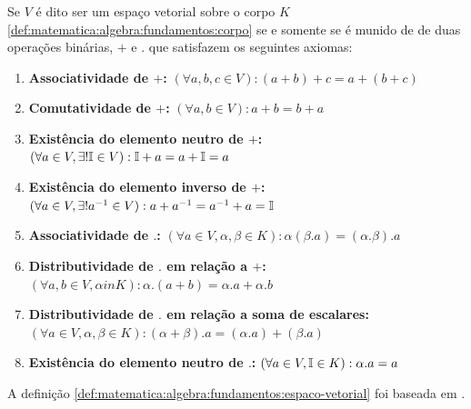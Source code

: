 \documentclass[../../main]{subfiles}
\begin{document}
\begin{defn}
    \label{def:matematica:algebra:fundamentos:espaco-vetorial}

    Se $V$ é dito ser um espaço vetorial sobre o corpo $K$
    \ref{def:matematica:algebra:fundamentos:corpo} se e somente se é munido de
    de duas operações binárias, $+$ e $.$ que satisfazem os seguintes axiomas:

    \begin{enumerate}
        \item \textbf{Associatividade de $+$:} $(\forall a,b,c \in V):
            (a+b)+c=a+(b+c)$

        \item \textbf{Comutatividade de $+$:} $(\forall a,b \in V): a+b=b+a$

        \item \textbf{Existência do elemento neutro de $+$:} $(\forall a \in V,
            \exists! \mathbb{I} \in V): \mathbb{I}+a=a+\mathbb{I}=a$

        \item \textbf{Existência do elemento inverso de $+$:} $(\forall a \in
            V, \exists! a^{-1} \in V): a+a^{-1}=a^{-1}+a=\mathbb{I}$

        \item \textbf{Associatividade de $.$:} $(\forall a \in V, \alpha, \beta
            \in K): \alpha(\beta.a) = (\alpha.\beta).a $

        \item \textbf{Distributividade de $.$ em relação a $+$:} $(\forall a, b
            \in V, \alpha in K): \alpha.(a+b)=\alpha.a+\alpha.b$

        \item \textbf{Distributividade de $.$ em relação a soma de escalares:}
            $(\forall a \in V, \alpha, \beta \in K):
            (\alpha+\beta).a=(\alpha.a)+(\beta.a)$

        \item \textbf{Existência do elemento neutro de $.$:} $(\forall a \in V,
            \mathbb{I} \in K): \alpha.a=a$
    \end{enumerate}
\end{defn}

A definição \ref{def:matematica:algebra:fundamentos:espaco-vetorial} foi
baseada em \cite{lima-2012}.
\end{document}
